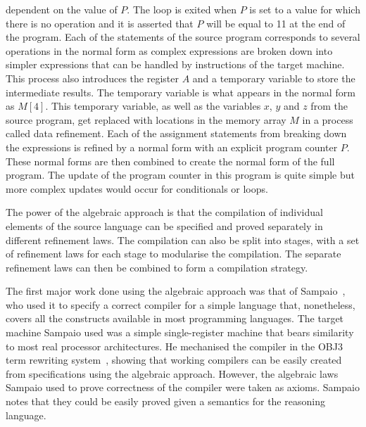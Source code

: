 \documentclass[a4paper,10pt]{report}
\begin{document}
dependent on the value of $P$.  The loop is exited when $P$ is set to a value
for which there is no operation and it is asserted that $P$ will be equal to 11
at the end of the program.  Each of the statements of the source program
corresponds to several operations in the normal form as complex expressions are
broken down into simpler expressions that can be handled by instructions of the
target machine.  This process also introduces the register $A$ and a temporary
variable to store the intermediate results.  The temporary variable is what
appears in the normal form as $M[4]$.  This temporary variable, as well as the
variables $x$, $y$ and $z$ from the source program, get replaced with locations
in the memory array $M$ in a process called data refinement.  Each of the
assignment statements from breaking down the expressions is refined by a normal
form with an explicit program counter $P$.  These normal forms are then combined
to create the normal form of the full program.  The update of the program
counter in this program is quite simple but more complex updates would occur for
conditionals or loops.

The power of the algebraic approach is that the compilation of individual
elements of the source language can be specified and proved separately in
different refinement laws.  The compilation can also be split into stages, with
a set of refinement laws for each stage to modularise the compilation.  The
separate refinement laws can then be combined to form a compilation strategy.

The first major work done using the algebraic approach was that of
Sampaio~\cite{sampaio1993}, who used it to specify a correct compiler for a
simple language that, nonetheless, covers all the constructs available in most
programming languages. The target machine Sampaio used was a simple
single-register machine that bears similarity to most real processor
architectures.  He mechanised the compiler in the OBJ3 term rewriting
system~\cite{goguen1988}, showing that working compilers can be easily created
from specifications using the algebraic approach.  However, the algebraic laws
Sampaio used to prove correctness of the compiler were taken as axioms. Sampaio
notes that they could be easily proved given a semantics for the reasoning
language.
\end{document}

